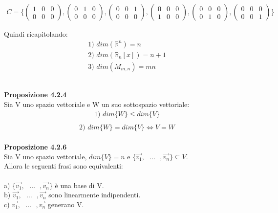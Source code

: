 \documentclass{article}
\begin{document}
\begin{align*}
  C = \{
    \begin{pmatrix}
    1 & 0 & 0 \\
    0 & 0 & 0
  \end{pmatrix},
  \begin{pmatrix}
    0 & 1 & 0 \\
    0 & 0 & 0
  \end{pmatrix},
  \begin{pmatrix}
    0 & 0 & 1 \\
    0 & 0 & 0
  \end{pmatrix},
  \begin{pmatrix}
    0 & 0 & 0 \\
    1 & 0 & 0
  \end{pmatrix},
  \begin{pmatrix}
    0 & 0 & 0 \\
    0 & 1 & 0
  \end{pmatrix},
  \begin{pmatrix}
    0 & 0 & 0 \\
    0 & 0 & 1
  \end{pmatrix}
  \}
\end{align*}

Quindi ricapitolando:
\begin{align*}
  \text{1) }dim(\mathbb{R}^n)=n \\
  \text{2) }dim(\mathbb{R}_n[x])=n+1 \\
  \text{3) }dim(M_{m,n})=mn
\end{align*}

\vspace{5px}
\textbf{\\Proposizione 4.2.4}
\\ Sia V uno spazio vettoriale e W un suo sottospazio vettoriale:
\begin{align*}
  \text{1) }dim\{W\} \leq dim\{V\} \\
\end{align*}
\begin{align*}
  \text{2) }dim\{W\} = dim\{V\} \iff V=W
\end{align*}
\vspace{5px}
\textbf{\\Proposizione 4.2.6}
\\ Sia V uno spazio vettoriale, $dim\{V\}=n$ e $\{\vec{v_1},\text{ }\dots\text{ },\vec{v_n}\} \subseteq V$. 
\\Allora le seguenti frasi sono equivalenti: 
\\\\
a) $\{\vec{v_1},\text{ }\dots \text{ },\vec{v_n}\}$ è una base di V. \\
b) $\vec{v_1},\text{ }\dots\text{ },\vec{v_n}$ sono linearmente indipendenti. \\
c) $\vec{v_1},\text{ }\dots\text{ },\vec{v_n}$ generano V. \\
\end{document}
